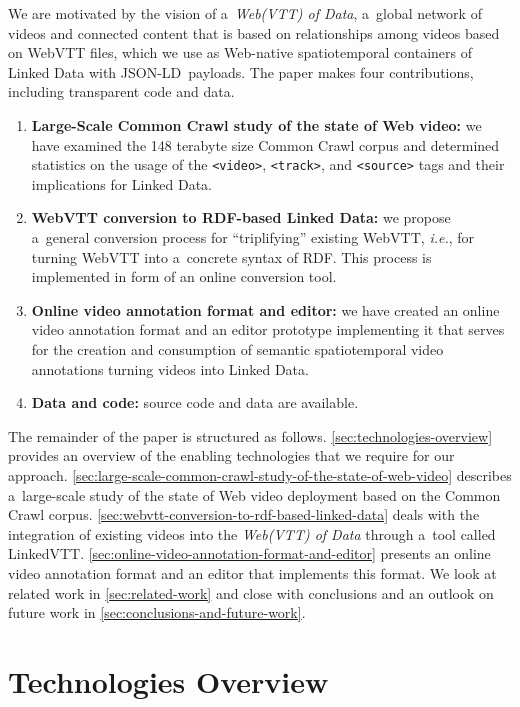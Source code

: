 \documentclass{sig-alternate}
\def\JSONLD{\mbox{JSON-LD}}
\begin{document}
We are motivated by the vision of a~\emph{Web(VTT) of Data},
a~global network of videos and connected content
that is based on relationships among videos based on WebVTT files,
which we use as Web-native spatiotemporal containers of Linked Data
with \JSONLD\ payloads.
The paper makes four contributions, including transparent code and data.

\begin{enumerate}[label=\textit{\roman*)},leftmargin=*]
  \item \textbf{Large-Scale Common Crawl study of the state of Web video:}
    we have examined the 148 terabyte size Common Crawl corpus
    and determined statistics on the usage of the \texttt{<video>},
    \texttt{<track>}, and \texttt{<source>} tags
    and their implications for Linked Data.
  \item \textbf{WebVTT conversion to RDF-based Linked Data:}
    we propose a~general conversion process for ``triplifying'' existing WebVTT,
    \emph{i.e.}, for turning WebVTT into a~concrete syntax of RDF.
    This process is implemented in form of an online conversion tool.
  \item \textbf{Online video annotation format and editor:} we have created an
  online video annotation format and an editor prototype implementing it
  that serves for the creation
  and consumption of semantic spatiotemporal video annotations
  turning videos into Linked Data.
  \item \textbf{Data and code:} source code and data are available.
\end{enumerate}

The remainder of the paper is structured as follows.
\autoref{sec:technologies-overview} provides an overview
of the enabling technologies that we require for our approach.
\autoref{sec:large-scale-common-crawl-study-of-the-state-of-web-video}
describes a~large-scale study of the state of Web video deployment
based on the Common Crawl corpus.
\autoref{sec:webvtt-conversion-to-rdf-based-linked-data} deals with
the integration of existing videos into the \emph{Web(VTT) of Data}
through a~tool called LinkedVTT.
\autoref{sec:online-video-annotation-format-and-editor} presents
an online video annotation format and an editor that implements this format.
We look at related work in \autoref{sec:related-work} and close
with conclusions and an outlook on future work
in \autoref{sec:conclusions-and-future-work}.

\section{Technologies Overview}
\label{sec:technologies-overview}
\end{document}
